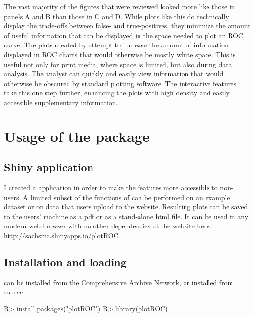 \documentclass[codesnippet]{jss}
\begin{document}
The vast majority of the figures that were reviewed looked more like
those in panels A and B than those in C and D. While plots like this do
technically display the trade-offs between false- and true-positives,
they minimize the amount of useful information that can be displayed in
the space needed to plot an ROC curve. The plots created by
 attempt to increase the amount of information displayed in
ROC charts that would otherwise be mostly white space. This is useful
not only for print media, where space is limited, but also during data
analysis. The analyst can quickly and easily view information that would
otherwise be obscured by standard plotting software. The interactive
features take this one step further, enhancing the plots with high
density and easily accessible supplementary information.

\section{Usage of the package}\label{usage-of-the-package}

\subsection{Shiny application}\label{shiny-application}

I created a  application \citep{shiny} in order to make the
features more accessible to non- users. A limited subset of
the functions of  can be performed on an example dataset or
on data that users upload to the website. Resulting plots can be saved
to the users' machine as a pdf or as a stand-alone html file. It can be
used in any modern web browser with no other dependencies at the website
here: http://sachsmc.shinyapps.io/plotROC.

\subsection{Installation and loading}\label{installation-and-loading}

 can be installed from the Comprehensive 
Archive Network, or installed from source.

\begin{Schunk}
\begin{Sinput}
R> install.packages("plotROC")
R> library(plotROC)
\end{Sinput}
\end{Schunk}
\end{document}
